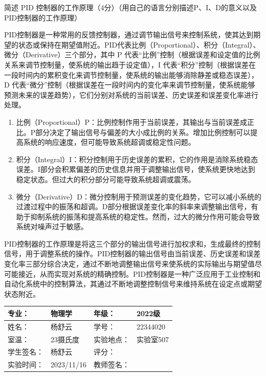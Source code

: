 \documentclass[dvipsnames, svgnames,a4paper,11pt]{article}
\begin{document}
	\begin{question}
		简述 PID 控制器的工作原理（4分）（用自己的语言分别描述P、I、D的意义以及PID控制器的工作原理）
	\end{question}
	PID控制器是一种常用的反馈控制器，通过调节输出信号来控制系统，使其达到期望的状态或保持在期望值附近。PID代表比例（Proportional）、积分（Integral）、微分（Derivative）三个部分，其中 P 代表“比例”控制（根据误差和设定值的比例关系来调节控制量，使系统的输出趋于设定值），I 代表“积分”控制（根据误差在一段时间内的累积变化来调节控制量，使系统的输出能够消除静差或稳态误差），D 代表“微分”控制（根据误差在一段时间内的变化率来调节控制量，使系统能够预测未来的误差趋势），它们分别对系统的当前误差、历史误差和误差变化率进行处理。
	\begin{enumerate}
		\item 比例（Proportional）P：比例控制作用于当前误差，其输出与当前误差成正比。P部分决定了输出信号与偏差的大小成比例的关系。增加比例控制可以提高系统的响应速度，但可能导致系统超调或稳定性问题。
		\item 积分（Integral）I：积分控制用于历史误差的累积，它的作用是消除系统稳态误差。I部分会积累偏差的历史信息并用于调整输出信号，使系统更快地达到稳定状态。但过大的积分部分可能导致系统超调或震荡。
		\item 微分（Derivative）D：微分控制用于预测误差的变化趋势，它可以减小系统的过渡过程中的振荡和超调。D部分根据误差变化率的斜率来调整输出信号，有助于抑制系统的振荡和提高系统的稳定性。然而，过大的微分作用可能会导致系统对噪声过于敏感。
	\end{enumerate}
	PID控制器的工作原理是将这三个部分的输出信号进行加权求和，生成最终的控制信号，用于调整系统的操作。PID控制器的输出信号由当前误差、历史误差和误差变化率三部分综合决定，通过不断地调整输出信号来使系统的实际输出与期望值尽可能接近，从而实现对系统的精确控制。PID控制器是一种广泛应用于工业控制和自动化系统中的控制算法，其通过不断地调整控制信号来维持系统在设定点或期望状态附近。
	
	\clearpage
	\begin{table}
		\renewcommand\arraystretch{1.7}
		\centering
		\begin{tabularx}{\textwidth}{|X|X|X|X|}
			\hline
			专业： & 物理学 & 年级： & 2022级 \\
			\hline
			姓名： & 杨舒云 & 学号： & 22344020\\
			\hline
			室温： & 23摄氏度 & 实验地点： & 实验室507 \\
			\hline
			学生签名：& 杨舒云 & 评分： &\\
			\hline
			实验时间：& 2023/11/16 & 教师签名：&\\
			\hline
		\end{tabularx}
	\end{table}
	
\end{document}
